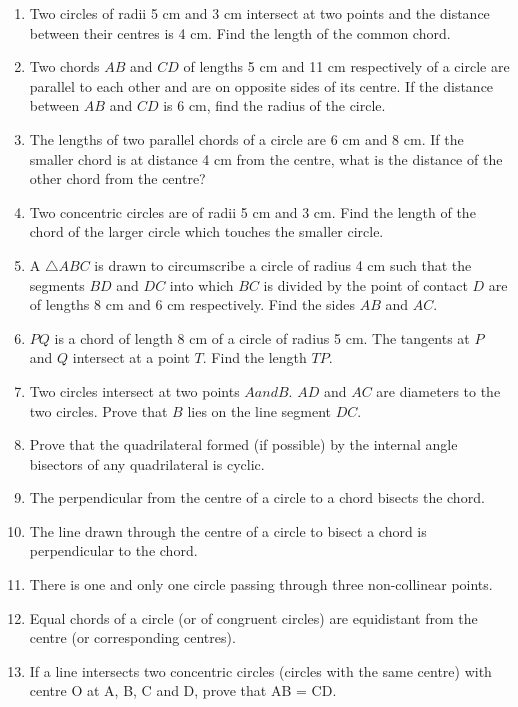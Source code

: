 \begin{enumerate}[label=\thesubsection.\arabic*.,ref=\thesubsection.\theenumi]
\item Two circles of radii 5 cm and 3 cm intersect at two points and the distance between their centres is 4 cm. Find the length of the common chord.
\item Two chords $AB$ and $CD$ of lengths 5 cm and 11 cm respectively of a circle are parallel
to each other and are on opposite sides of its centre. If the distance between $AB$ and
$CD$ is 6 cm, find the radius of the circle.
\item The lengths of two parallel chords of a circle are 6 cm and 8 cm. If the smaller chord is
at distance 4 cm from the centre, what is the distance of the other chord from the
centre?
\item  Two concentric circles are of radii 5 cm and 3 cm. Find the length of the chord of the larger circle which touches the smaller circle.
\item A $\triangle ABC$ is drawn to circumscribe a circle of radius 4 cm such that the segments $BD$ and $DC$ into which $BC$ is divided by the point of contact $D$ are of lengths 8 cm and 6 cm respectively. Find the sides $AB$ and $AC$.
\item $PQ$ is a chord of length 8 cm of a circle of radius 5 cm. The tangents at $P$ and $Q$ intersect at a point $T$. Find the length $TP$.
\item Two circles intersect at two points $A and B$. $AD$ and $AC$ are diameters to the two circles. Prove that $B$ lies on the line segment $DC$.
\item Prove that the quadrilateral formed (if possible) by the internal angle bisectors of any quadrilateral is cyclic.
\item  The perpendicular from the centre of a circle to a chord bisects the chord. 
\item  The line drawn through the centre of a circle to bisect a chord is perpendicular to the chord.
\item  There is one and only one circle passing through three non-collinear points. 
\item  Equal chords of a circle (or of congruent circles) are equidistant from the centre (or corresponding centres).
\item If a line intersects two concentric circles (circles with the same centre) with centre O at A, B, C and D, prove that AB = CD.
	\iffalse
\begin{enumerate}


\end{enumerate}

\end{enumerate}
